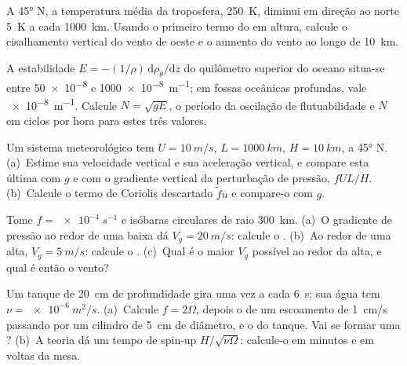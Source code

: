 \begin{exercise}[$\star$]\label{exo:b3:gfd-foundations:3}
A \ang{45} N, a temperatura média da troposfera, \qty{250}{K}, diminui
em direção ao norte \qty{5}{K} a cada \qty{1000}{km}. Usando o primeiro termo do
 em altura, calcule o cisalhamento vertical do vento de oeste e
o aumento do vento ao longo de \qty{10}{km}.
\end{exercise}

\begin{exercise}[$\star$]\label{exo:b3:gfd-foundations:4}
A estabilidade $E = -(1/\rho)\,\mathrm d\rho_\theta/\mathrm dz$ do quilômetro superior do
oceano situa-se entre \num{50e-8} e \qty{1000e-8}{m^{-1}};
em fossas oceânicas profundas, vale \qty{e-8}{m^{-1}}. Calcule $N = \sqrt{gE}$, o
período da oscilação de flutuabilidade e $N$ em ciclos por hora para estes
três valores.
\end{exercise}

\begin{exercise}[$\star\star$]\label{exo:b3:gfd-foundations:5}
Um sistema meteorológico tem $U = \qty{10}{m/s}$, $L = \qty{1000}{km}$, $H =
\qty{10}{km}$, a \ang{45} N. (a)~Estime sua velocidade vertical e sua
aceleração vertical, e compare esta última com $g$ e com o
gradiente vertical da perturbação de pressão, $fUL/H$. (b)~Calcule o
termo de Coriolis descartado $\tilde fu$ e compare-o com $g$.
\end{exercise}

\begin{exercise}[$\star\star$]\label{exo:b3:gfd-foundations:6}
Tome $f = \qty{e-4}{s^{-1}}$ e isóbaras circulares de raio
\qty{300}{km}. (a)~O gradiente de pressão ao redor de uma baixa dá $V_g =
\qty{20}{m/s}$: calcule o . (b)~Ao redor de uma alta,
$V_g = \qty{5}{m/s}$: calcule o . (c)~Qual é o maior
$V_g$ possível ao redor da alta, e qual é então o vento?
\end{exercise}

\begin{exercise}[$\star\star$]\label{exo:b3:gfd-foundations:7}
Um tanque de \qty{20}{cm} de profundidade gira uma vez a cada \qty{6}{s}; sua água tem $\nu =
\qty{e-6}{m^2/s}$. (a)~Calcule $f = 2\Omega$, depois o  de um
escoamento de \qty{1}{cm/s} passando por um cilindro de \qty{5}{cm} de diâmetro, e o 
do tanque. Vai se formar uma ? (b)~A teoria dá um tempo de spin-up
$H/\sqrt{\nu\Omega}$: calcule-o em minutos e em voltas da mesa.
\end{exercise}

